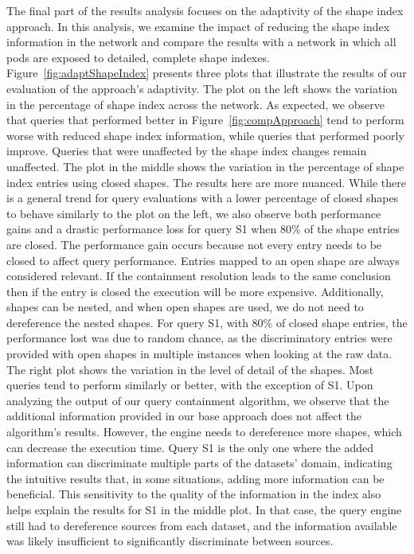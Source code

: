 The final part of the results analysis focuses on the adaptivity of the shape index approach.
In this analysis, we examine the impact of reducing the shape index information in the network and compare the results with a network in which all pods are exposed to detailed, complete shape indexes.
Figure~\ref{fig:adaptShapeIndex} presents three plots that illustrate the results of our evaluation of the approach's adaptivity.
The plot on the left shows the variation in the percentage of shape index across the network. 
As expected, we observe that queries that performed better in Figure~\ref{fig:compApproach} tend to perform worse with reduced shape index information, while queries that performed poorly improve. 
Queries that were unaffected by the shape index changes remain unaffected.
The plot in the middle shows the variation in the percentage of shape index entries using closed shapes.
The results here are more nuanced.
While there is a general trend for query evaluations with a lower percentage of closed shapes to behave similarly to the plot on the left, we also observe both performance gains and a drastic performance loss for query S1 when 80\% of the shape entries are closed.
The performance gain occurs because not every entry needs to be closed to affect query performance.
Entries mapped to an open shape are always considered relevant.
If the containment resolution leads to the same conclusion then if the entry is closed the execution will be more expensive. 
Additionally, shapes can be nested, and when open shapes are used, we do not need to dereference the nested shapes.
For query S1, with 80\% of closed shape entries, the performance lost was due to random chance, as the discriminatory entries were provided with open shapes in multiple instances when looking at the raw data.
The right plot shows the variation in the level of detail of the shapes.
Most queries tend to perform similarly or better, with the exception of S1.
Upon analyzing the output of our query containment algorithm, we observe that the additional information provided in our base approach does not affect the algorithm’s results.
However, the engine needs to dereference more shapes, which can decrease the execution time.
Query S1 is the only one where the added information can discriminate multiple parts of the datasets' domain, indicating the intuitive results that, in some situations, adding more information can be beneficial.
This sensitivity to the quality of the information in the index also helps explain the results for S1 in the middle plot. 
In that case, the query engine still had to dereference sources from each dataset, and the information available was likely insufficient to significantly discriminate between sources.

